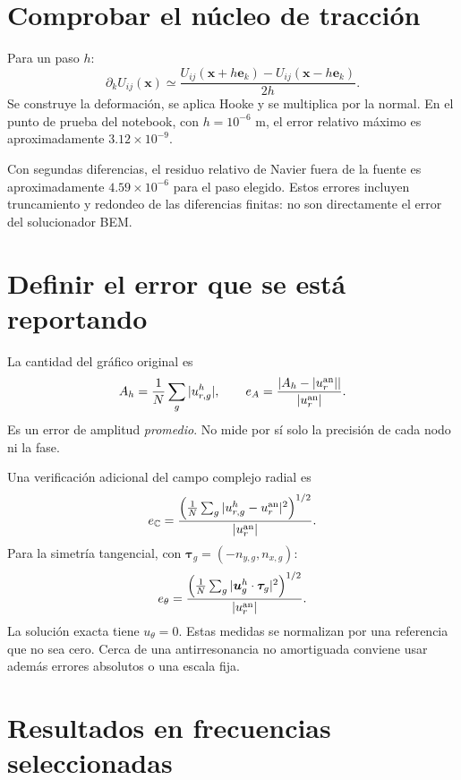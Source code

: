 \documentclass[11pt,a4paper]{report}
\numberwithin{equation}{chapter}
\newcommand{\vect}[1]{\bm{#1}}
\begin{document}
\section{Comprobar el n\'ucleo de tracci\'on}
Para un paso $h$:
\begin{equation}
 \partial_kU_{ij}(\vect x)\simeq
 \frac{U_{ij}(\vect x+h\vect e_k)-U_{ij}(\vect x-h\vect e_k)}{2h}.
\end{equation}
Se construye la deformaci\'on, se aplica Hooke y se multiplica por
la normal. En el punto de prueba del notebook, con $h=10^{-6}$ m,
el error relativo m\'aximo es aproximadamente
$3.12\times10^{-9}$.

Con segundas diferencias, el residuo relativo de Navier fuera de la
fuente es aproximadamente $4.59\times10^{-6}$ para el paso elegido.
Estos errores incluyen truncamiento y redondeo de las diferencias
finitas: no son directamente el error del solucionador BEM.

\section{Definir el error que se est\'a reportando}
La cantidad del gr\'afico original es
\begin{equation}
 A_h=\frac1N\sum_g|u_{r,g}^{h}|,\qquad
 e_A=\frac{|A_h-|u_r^{\rm an}||}{|u_r^{\rm an}|}.
 \label{eq:error-amplitud}
\end{equation}
Es un error de amplitud \emph{promedio}. No mide por s\'i solo la
precisi\'on de cada nodo ni la fase.

Una verificaci\'on adicional del campo complejo radial es
\begin{equation}
 e_{\mathbb C}=
 \frac{\left(\frac1N\sum_g|u_{r,g}^{h}-u_r^{\rm an}|^2\right)^{1/2}}
 {|u_r^{\rm an}|}.
 \label{eq:error-complejo}
\end{equation}
Para la simetr\'ia tangencial, con
$\vect\tau_g=(-n_{y,g},n_{x,g})$:
\begin{equation}
 e_\theta=
 \frac{\left(\frac1N\sum_g|\vect u_g^h\cdot\vect\tau_g|^2\right)^{1/2}}
 {|u_r^{\rm an}|}.
\end{equation}
La soluci\'on exacta tiene $u_\theta=0$.
Estas medidas se normalizan por una referencia que no sea cero.
Cerca de una antirresonancia no amortiguada conviene usar adem\'as
errores absolutos o una escala fija.

\section{Resultados en frecuencias seleccionadas}
\begin{table}[htbp]
\centering\small
\resizebox{\textwidth}{!}{}
\caption{Amplitudes y error relativo de su promedio. La frecuencia se
expresa en rad/s. La notaci\'on \texttt{e-04} significa
$\times10^{-4}$; los errores son fracciones, no porcentajes.}
\label{tab:verificacion}
\end{table}
\end{document}
